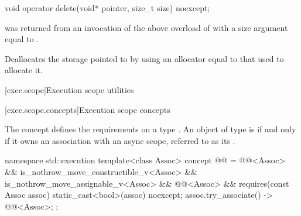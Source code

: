 %
\begin{itemdecl}
void operator delete(void* pointer, size_t size) noexcept;
\end{itemdecl}
\begin{itemdescr}
\pnum
\expects
{} was returned from an invocation of the above overload
of  with a size argument equal to .

\pnum
\effects
Deallocates the storage pointed to by  using an
allocator equal to that used to allocate it.
\end{itemdescr}

[exec.scope]{Execution scope utilities}

[exec.scope.concepts]{Execution scope concepts}

\pnum
The  concept defines
the requirements on a type .
An object of type  is 
if and only if it owns an association with an async scope,
referred to as its .

\begin{codeblock}
namespace std::execution {
  template<class Assoc>
    concept @@ =
      @@<Assoc> &&
      is_nothrow_move_constructible_v<Assoc> &&
      is_nothrow_move_assignable_v<Assoc> &&
      @@<Assoc> &&
      requires(const Assoc assoc) {
        { static_cast<bool>(assoc) } noexcept;
        { assoc.try_associate() } -> @@<Assoc>;
      };
}
\end{codeblock}

